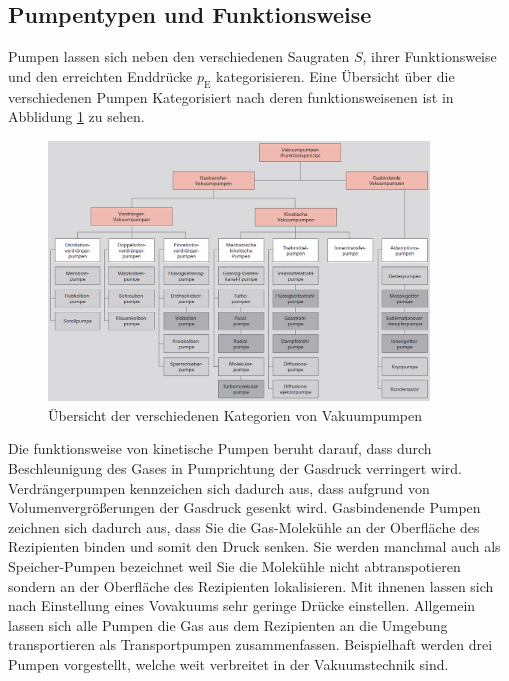 \subsection{Pumpentypen und Funktionsweise}
Pumpen lassen sich neben den verschiedenen Saugraten $S$, ihrer Funktionsweise und den erreichten Enddrücke $p_\text{E}$ kategorisieren. Eine Übersicht über die verschiedenen Pumpen Kategorisiert nach deren funktionsweisenen ist in Abblidung \ref{fig:Uebersicht} zu sehen.
\begin{figure}[htbp]
  \centering
  \includegraphics[width=0.9\textwidth]{picture/Uebersicht.png}
  \caption{Übersicht der verschiedenen Kategorien von Vakuumpumpen \cite{Uebersicht}}
  \label{fig:Uebersicht}
\end{figure}
Die funktionsweise von kinetische Pumpen beruht darauf, dass durch Beschleunigung des Gases in Pumprichtung der Gasdruck verringert wird.
Verdrängerpumpen kennzeichen sich dadurch aus, dass aufgrund von Volumenvergrößerungen der Gasdruck gesenkt wird.
Gasbindenende Pumpen zeichnen sich dadurch aus, dass Sie die Gas-Molekühle an der Oberfläche des Rezipienten binden und somit den Druck senken. Sie werden manchmal auch als Speicher-Pumpen bezeichnet weil Sie die Molekühle nicht abtranspotieren sondern an der Oberfläche des Rezipienten lokalisieren. Mit ihnenen lassen sich nach Einstellung eines Vovakuums sehr geringe Drücke einstellen.
Allgemein lassen sich alle Pumpen die Gas aus dem Rezipienten an die Umgebung transportieren als Transportpumpen zusammenfassen. 
Beispielhaft werden drei Pumpen vorgestellt, welche weit verbreitet in der Vakuumstechnik sind. 
